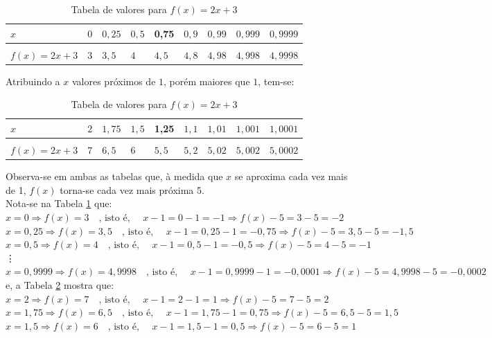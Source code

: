 \begin{table}[H]
\centering
\caption{Tabela de valores para $f(x) = 2x+3$}
\label{tab:tab1}
\smallskip
\begin{tabular}{l|l|l|l|l|l|l|l|l}
\hline
 $x$ & $0$ & $0,25$ & $0,5$ & 0,75& $0,9$& $0,99$ & $0,999$ & $0,9999$\\[0.5ex]
\hline
&&&&&&&&\\[-2ex]
$f(x) = 2x+3$ & $3$ &  $3,5$ &  $4$ &  $4,5$ &  $4,8$&  $4,98$ &  $4,998$ &  $4,9998$\\[0.5ex]
\hline
\end{tabular}
\end{table}
Atribuindo a $x$ valores próximos de $1$, porém maiores que $1$, tem-se:
\begin{table}[H]
\centering
\caption{Tabela de valores para $f(x) = 2x+3$}
\label{tab:tab20}
\smallskip
\begin{tabular}{l|l|l|l|l|l|l|l|l}
\hline
 $x$ & $2$ & $1,75$ & $1,5$ & 1,25& $1,1$& $1,01$ & $1,001$ & $1,0001$\\[0.5ex]
\hline
&&&&&&&&\\[-2ex]
$f(x) = 2x+3$ & $7$ &  $6,5$ &  $6$ &  $5,5$ &  $5,2$&  $5,02$ &  $5,002$ &  $5,0002$\\[0.5ex]
\hline
\end{tabular}
\end{table}
Observa-se em ambas as tabelas que, à medida que $x$ se aproxima cada vez mais de 1, $f(x)$ torna-se cada vez mais próxima 5.\\
Nota-se na Tabela \ref{tab:tab1} que:\\
$ x = 0 \Rightarrow f(x) = 3 \quad \textrm{, isto é, } \quad x-1=0-1=-1\Rightarrow f(x) - 5 = 3-5 = -2$
$ x = 0,25 \Rightarrow f(x) = 3,5  \quad \textrm{, isto é, } \quad x-1=0,25-1=-0,75\Rightarrow f(x) - 5 = 3,5-5 = -1,5$
$ x = 0,5 \Rightarrow f(x) = 4 \quad \textrm{, isto é, } \quad x-1=0,5-1=-0,5\Rightarrow f(x) - 5 = 4-5 = -1$ \\
\vdots \\
$ x = 0,9999 \Rightarrow f(x) = 4,9998 \quad \textrm{, isto é, } \quad x-1=0,9999-1=-0,0001\Rightarrow f(x) - 5 = 4,9998-5 = -0,0002$\\
e, a Tabela \ref{tab:tab20}  mostra que:\\
$ x = 2 \Rightarrow f(x) = 7 \quad \textrm{, isto é, } \quad x-1=2-1=1\Rightarrow f(x) - 5 = 7-5 = 2$
$ x = 1,75 \Rightarrow f(x) = 6,5  \quad \textrm{, isto é, } \quad x-1=1,75-1=0,75\Rightarrow f(x) - 5 = 6,5-5 = 1,5$
$ x = 1,5 \Rightarrow f(x) = 6 \quad \textrm{, isto é, } \quad x-1=1,5-1=0,5\Rightarrow f(x) - 5 = 6-5 = 1$ \\
